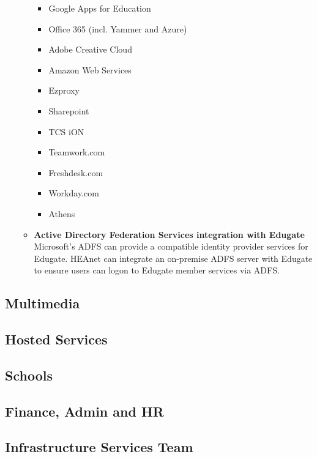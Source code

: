\documentclass{article}
\begin{document}
\begin{itemize}
\begin{itemize}
\begin{itemize}
	      	      	\item Google Apps for Education
	      	      	\item Office 365 (incl. Yammer and Azure)
	      	      	\item Adobe Creative Cloud
	      	      	\item Amazon Web Services
	      	      	\item Ezproxy
	      	      	\item Sharepoint
	      	      	\item TCS iON
	      	      	\item Teamwork.com
	      	      	\item Freshdesk.com
	      	      	\item Workday.com
	      	      	\item Athens
	      	      	      
	      	      \end{itemize}
	      	\item \textbf{Active Directory Federation Services integration with Edugate}\\
	      	      Microsoft's ADFS can provide a compatible identity provider services for Edugate. HEAnet can integrate an on-premise ADFS server with Edugate to ensure users can logon to Edugate member services via ADFS.
	      \end{itemize}
\end{itemize}
\subsection{Multimedia}
\subsection{Hosted Services}
\subsection{Schools}
\subsection{Finance, Admin and HR}
\subsection{Infrastructure Services Team}
\end{document}
